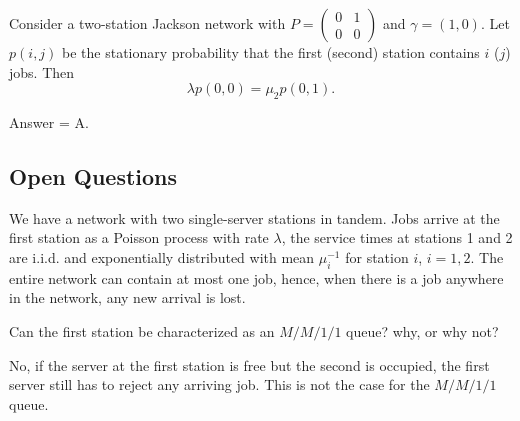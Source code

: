 \begin{exercise}[201907]
 Consider a two-station Jackson network with $P=
 \begin{pmatrix}
 0 &1 \\
 0 & 0
 \end{pmatrix}$ and $\gamma = (1, 0)$.
 Let $p(i,j)$ be the stationary probability that the first (second) station contains $i$ ($j$) jobs.
 Then
 \begin{equation*}
 \lambda p(0, 0) = \mu_2 p(0, 1).
 \end{equation*}
\begin{solution}
Answer = A.
\end{solution}
\end{exercise}





\subsection{Open Questions}

We have a network with two single-server stations in tandem.
Jobs arrive at the first station as a Poisson process with rate $\lambda$, the service times at stations 1 and 2 are i.i.d.
and exponentially distributed with mean $\mu_i^{-1}$ for station $i$, $i=1,2$.
The entire network can contain at most one job, hence, when there is a job anywhere in the network, any new arrival is lost.



\begin{exercise}[201704]
 Can the first station be characterized as an $M/M/1/1$ queue? why, or why not?
\begin{solution}
 No, if the server at the first station is free but the second is occupied, the first server still has to reject any arriving job. This is not the case for the $M/M/1/1$ queue.
\end{solution}
\end{exercise}


